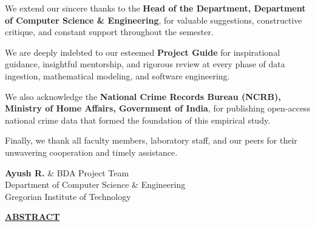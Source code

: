 \documentclass[12pt,a4paper]{report}
\begin{document}
\vspace{0.5cm}
\noindent We extend our sincere thanks to the \textbf{Head of the Department, Department of Computer Science \& Engineering}, for valuable suggestions, constructive critique, and constant support throughout the semester.

\vspace{0.5cm}
\noindent We are deeply indebted to our esteemed \textbf{Project Guide} for inspirational guidance, insightful mentorship, and rigorous review at every phase of data ingestion, mathematical modeling, and software engineering.

\vspace{0.5cm}
\noindent We also acknowledge the \textbf{National Crime Records Bureau (NCRB), Ministry of Home Affairs, Government of India}, for publishing open-access national crime data that formed the foundation of this empirical study.

\vspace{0.5cm}
\noindent Finally, we thank all faculty members, laboratory staff, and our peers for their unwavering cooperation and timely assistance.

\vspace{2cm}
\begin{flushright}
    \textbf{Ayush R.} \& BDA Project Team\\
    Department of Computer Science \& Engineering\\
    Gregorian Institute of Technology
\end{flushright}
\newpage

\thispagestyle{frontmatterstyle}
\begin{center}
    \vspace*{0.5cm}
    {\fontsize{14}{18}\selectfont\bfseries\underline{ABSTRACT}\par}
\end{center}
\vspace{1cm}
\end{document}
